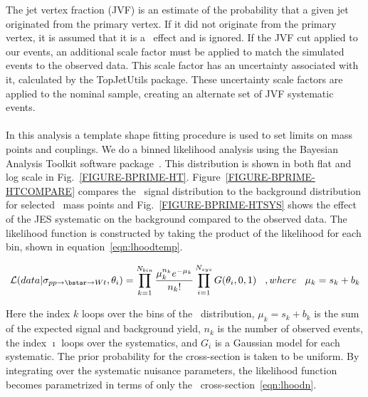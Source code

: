 The jet vertex fraction (JVF) is an estimate of the probability that a given jet originated from the primary vertex. If it did not originate from the primary vertex, it is assumed that it is a \pileup\ effect and is ignored. If the JVF cut applied to our events, an additional scale factor must be applied to match the simulated events to the observed data. This scale factor has an uncertainty associated with it, calculated by the {\sc TopJetUtils} package. These uncertainty scale factors are applied to the nominal sample, creating an alternate set of JVF systematic events.\\
\\
In this analysis a template shape fitting procedure is used to set limits on mass points and couplings. We do a binned likelihood analysis using the Bayesian Analysis Toolkit software package~\cite{Caldwell:2008fw}. This distribution is shown in both flat and log scale in Fig.~\ref{FIGURE-BPRIME-HT}. Figure~\ref{FIGURE-BPRIME-HTCOMPARE} compares the \HT\ signal distribution to the background distribution for selected \bstar\ mass points and Fig.~\ref{FIGURE-BPRIME-HTSYS} shows the effect of the JES systematic on the background compared to the observed data. The likelihood function is constructed by taking the product of the likelihood for each bin, shown in equation~\ref{eqn:lhoodtemp}.



\begin{equation}
  {\cal L}(data|\sigma_{pp\to \bstar \to Wt},\theta_i) = \prod_{k=1}^{N_{bin}} \frac{\mu_k^{n_k} e^{-\mu_k}}{n_k!}\prod_{i=1}^{N_{sys}}G(\theta_i,0,1) \hspace{0.3cm}
  ,where \hspace{0.3cm} \mu_k = s_k + b_k
\label{eqn:lhoodtemp} 
\end{equation}

\noindent
Here the index $k$ loops over the bins of the \HT\ distribution, $\mu_k = s_k + b_k$ is the sum of the expected signal and background yield, $n_k$ is the number of observed events, the index $\imath$ loops over the systematics, and $G_i$ is a Gaussian model for each systematic. The prior probability for the cross-section is taken to be uniform. By integrating over the systematic nuisance parameters, the likelihood function becomes parametrized in terms of only the \bstar\ cross-section~\ref{eqn:lhoodn}.


